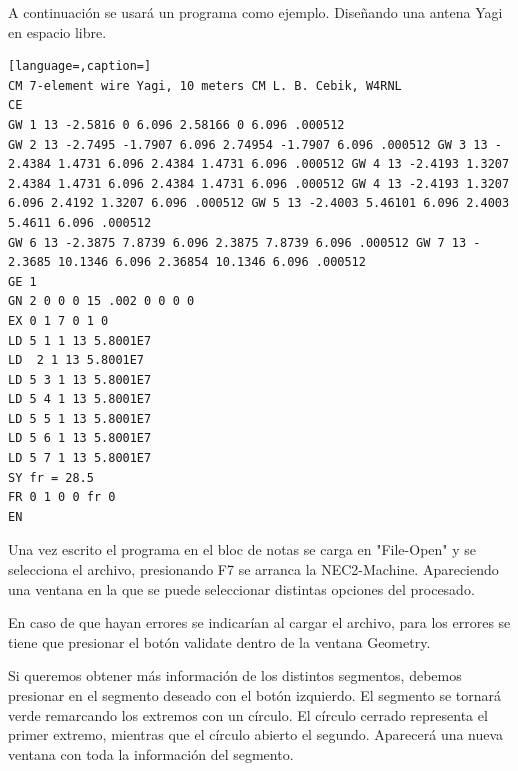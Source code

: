 \documentclass[12pt]{article}
\begin{document}
A continuaci\'on se usar\'a un programa como ejemplo. Diseñando una antena Yagi en espacio libre.

\begin{lstlisting}[language=,caption=]
CM 7-element wire Yagi, 10 meters CM L. B. Cebik, W4RNL
CE
GW 1 13 -2.5816 0 6.096 2.58166 0 6.096 .000512
GW 2 13 -2.7495 -1.7907 6.096 2.74954 -1.7907 6.096 .000512 GW 3 13 -
2.4384 1.4731 6.096 2.4384 1.4731 6.096 .000512 GW 4 13 -2.4193 1.3207
2.4384 1.4731 6.096 2.4384 1.4731 6.096 .000512 GW 4 13 -2.4193 1.3207
6.096 2.4192 1.3207 6.096 .000512 GW 5 13 -2.4003 5.46101 6.096 2.4003
5.4611 6.096 .000512
GW 6 13 -2.3875 7.8739 6.096 2.3875 7.8739 6.096 .000512 GW 7 13 -
2.3685 10.1346 6.096 2.36854 10.1346 6.096 .000512
GE 1
GN 2 0 0 0 15 .002 0 0 0 0
EX 0 1 7 0 1 0
LD 5 1 1 13 5.8001E7
LD  2 1 13 5.8001E7
LD 5 3 1 13 5.8001E7
LD 5 4 1 13 5.8001E7
LD 5 5 1 13 5.8001E7
LD 5 6 1 13 5.8001E7
LD 5 7 1 13 5.8001E7
SY fr = 28.5
FR 0 1 0 0 fr 0
EN
\end{lstlisting}

Una vez escrito el programa en el bloc de notas se carga en "File-Open" y se selecciona el archivo, presionando F7 se arranca la NEC2-Machine. Apareciendo una ventana en la que se puede seleccionar distintas opciones del procesado.

En caso de que hayan errores se indicar\'ian al cargar el archivo, para los errores se tiene que presionar el bot\'on validate dentro de la ventana Geometry.

Si queremos obtener m\'as información de los distintos segmentos, debemos presionar en el segmento deseado con el botón izquierdo. El segmento se tornar\'a verde remarcando los extremos con un círculo. El círculo cerrado representa el primer extremo, mientras que el círculo abierto el segundo. Aparecer\'a una nueva ventana con toda la información del segmento.

\end{document}
